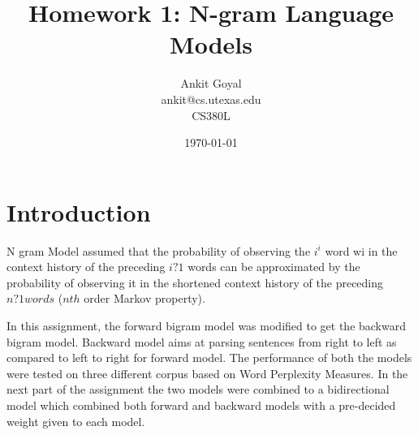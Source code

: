 \documentclass[10pt] {article}
\author{Ankit Goyal \\ankit@cs.utexas.edu \\ CS380L}
\title{Homework 1: N-gram Language Models}
\date{\today}
\begin{document}
\maketitle


\section{Introduction}
N gram Model assumed that the probability of observing the $i^{i}$ word wi in the context history of the preceding $i ? 1$ words can be approximated by the probability of observing it in the shortened context history of the preceding $n ? 1 words$ ($nth$ order Markov property).

In this assignment, the forward bigram model was modified to get the backward bigram model. Backward model aims at parsing sentences from right to left as compared to left to right for forward model. The performance of both the models were tested on three different corpus based on Word Perplexity Measures. In the next part of the assignment the two models were combined to a bidirectional model which combined both forward and backward models with a pre-decided weight given to each model. 


\end{document}
